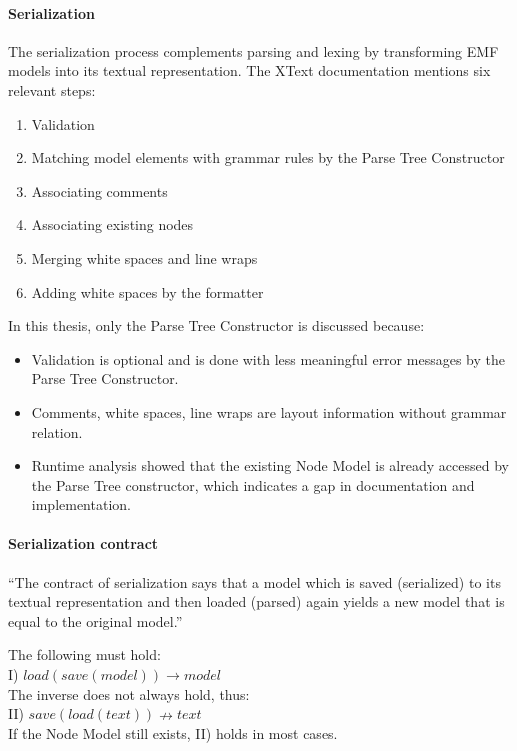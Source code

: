 \paragraph{Serialization}
The serialization process complements parsing and lexing by transforming EMF models into its textual representation. The XText documentation mentions six relevant steps:

\begin{enumerate}
	\item Validation
	\item Matching model elements with grammar rules by the Parse Tree Constructor
	\item Associating comments
	\item Associating existing nodes
	\item Merging white spaces and line wraps
	\item Adding white spaces by the formatter
\end{enumerate}

In this thesis, only the Parse Tree Constructor is discussed because:
\begin{itemize}
	\item Validation is optional and is done with less meaningful error messages by the Parse Tree Constructor.
	\item Comments, white spaces, line wraps are layout information without grammar relation.
	\item Runtime analysis showed that the existing Node Model is already accessed by the Parse Tree constructor, which indicates a gap in documentation and implementation.
\end{itemize}

\paragraph{Serialization contract}
``The contract of serialization says that a model which is saved (serialized) to its textual representation and then loaded (parsed) again yields a new model that is equal to the original model.''\cite{XTextMan}

The following must hold:\\
I) $load(save(model)) \rightarrow model$\\
The inverse does not always hold, thus:\\
II) $save(load(text)) \nrightarrow text$\\
If the Node Model still exists, II) holds in most cases. 

